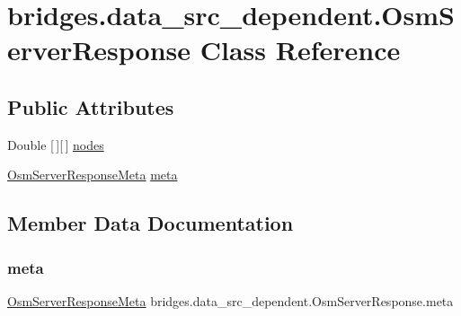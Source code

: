 \hypertarget{classbridges_1_1data__src__dependent_1_1_osm_server_response}{}\section{bridges.\+data\+\_\+src\+\_\+dependent.\+Osm\+Server\+Response Class Reference}
\label{classbridges_1_1data__src__dependent_1_1_osm_server_response}
\subsection*{Public Attributes}
\begin{DoxyCompactItemize}
\item 
Double \mbox{[}$\,$\mbox{]}\mbox{[}$\,$\mbox{]} \hyperlink{classbridges_1_1data__src__dependent_1_1_osm_server_response_a09cf784347684b5c551cb88690bd1933}{nodes}
\item 
\hyperlink{classbridges_1_1data__src__dependent_1_1_osm_server_response_meta}{Osm\+Server\+Response\+Meta} \hyperlink{classbridges_1_1data__src__dependent_1_1_osm_server_response_a52c2cacc02fde7bc2f29427c96a400f5}{meta}
\end{DoxyCompactItemize}


\subsection{Member Data Documentation}
\mbox{\label{classbridges_1_1data__src__dependent_1_1_osm_server_response_a52c2cacc02fde7bc2f29427c96a400f5}} 
\subsubsection{\texorpdfstring{meta}{meta}}
{\footnotesize\ttfamily \hyperlink{classbridges_1_1data__src__dependent_1_1_osm_server_response_meta}{Osm\+Server\+Response\+Meta} bridges.\+data\+\_\+src\+\_\+dependent.\+Osm\+Server\+Response.\+meta}

\mbox{\label{classbridges_1_1data__src__dependent_1_1_osm_server_response_a09cf784347684b5c551cb88690bd1933}} 
